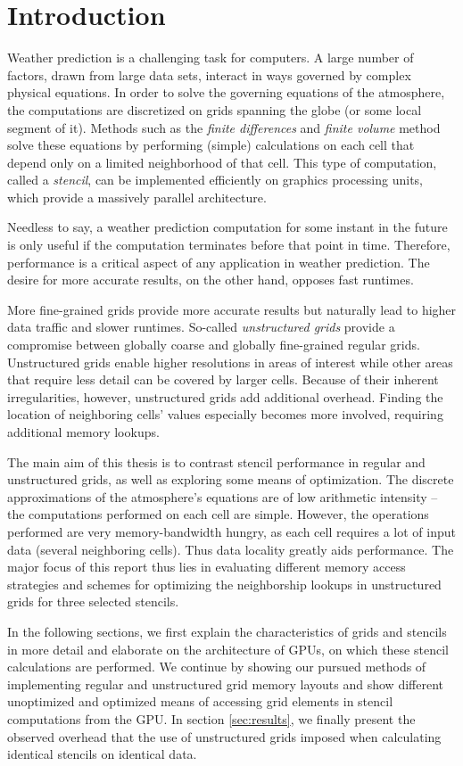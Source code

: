\chapter*{Introduction}

Weather prediction is a challenging task for computers. A large number of factors, drawn from large data sets, interact in ways governed by complex physical equations. In order to solve the governing equations of the atmosphere, the computations are discretized on grids spanning the globe (or some local segment of it). Methods such as the \emph{finite differences} and \emph{finite volume} method solve these equations by performing (simple) calculations on each cell that depend only on a limited neighborhood of that cell. This type of computation, called a \emph{stencil}, can be implemented efficiently on graphics processing units, which provide a massively parallel architecture. 

Needless to say, a weather prediction computation for some instant in the future is only useful if the computation terminates before that point in time. Therefore, performance is a critical aspect of any application in weather prediction. The desire for more accurate results, on the other hand, opposes fast runtimes.

More fine-grained grids provide more accurate results but naturally lead to higher data traffic and slower runtimes. So-called \emph{unstructured grids} provide a compromise between globally coarse and globally fine-grained regular grids. Unstructured grids enable higher resolutions in areas of interest while other areas that require less detail can be covered by larger cells. Because of their inherent irregularities, however, unstructured grids add additional overhead. Finding the location of neighboring cells' values especially becomes more involved, requiring additional memory lookups.

The main aim of this thesis is to contrast stencil performance in regular and unstructured grids, as well as exploring some means of optimization. The discrete approximations of the atmosphere's equations are of low arithmetic intensity -- the computations performed on each cell are simple. However, the operations performed are very memory-bandwidth hungry, as each cell requires a lot of input data (several neighboring cells). Thus data locality greatly aids performance. The major focus of this report thus lies in evaluating different memory access strategies and schemes for optimizing the neighborship lookups in unstructured grids for three selected stencils.

In the following sections, we first explain the characteristics of grids and stencils in more detail and elaborate on the architecture of GPUs, on which these stencil calculations are performed. We continue by showing our pursued methods of implementing regular and unstructured grid memory layouts and show different unoptimized and optimized means of accessing grid elements in stencil computations from the GPU. In section \ref{sec:results}, we finally present the observed overhead that the use of unstructured grids imposed when calculating identical stencils on identical data.